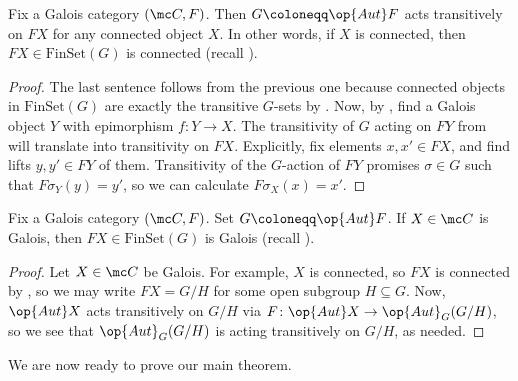 \documentclass{amsart}
\begin{document}
\begin{corollary} \label{cor:connected-to-connected}
    Fix a Galois category $(\mc C,F)$. Then $G\coloneqq\op{Aut}F$ acts transitively on $FX$ for any connected object $X$. In other words, if $X$ is connected, then $FX\in\mathrm{FinSet}(G)$ is connected (recall ).
\end{corollary}
\begin{proof}
    The last sentence follows from the previous one because connected objects in $\mathrm{FinSet}(G)$ are exactly the transitive $G$-sets by . Now, by , find a Galois object $Y$ with epimorphism $f\colon Y\to X$. The transitivity of $G$ acting on $FY$ from  will translate into transitivity on $FX$. Explicitly, fix elements $x,x'\in FX$, and find lifts $y,y'\in FY$ of them. Transitivity of the $G$-action of $FY$ promises $\sigma\in G$ such that $F\sigma_Y(y)=y'$, so we can calculate $F\sigma_X(x)=x'$.
\end{proof}
\begin{corollary} \label{cor:galois-to-galois}
    Fix a Galois category $(\mc C,F)$. Set $G\coloneqq\op{Aut}F$. If $X\in\mc C$ is Galois, then $FX\in\mathrm{FinSet}(G)$ is Galois (recall ).
\end{corollary}
\begin{proof}
    Let $X\in\mc C$ be Galois. For example, $X$ is connected, so $FX$ is connected by , so we may write $FX=G/H$ for some open subgroup $H\subseteq G$. Now, $\op{Aut}X$ acts transitively on $G/H$ via $F\colon\op{Aut}X\to\op{Aut}_G(G/H)$, so we see that $\op{Aut}_G(G/H)$ is acting transitively on $G/H$, as needed.
\end{proof}
We are now ready to prove our main theorem.
\maingaloisthm*
\end{document}
